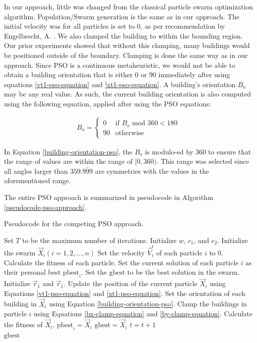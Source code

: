 In our approach, little was changed from the classical particle swarm optimization algorithm. Population/Swarm generation is the same as in our approach. The initial velocity was for all particles is set to $0$, as per recommendation by Engelbrecht, A. \cite{Engelbrecht2012}. We also clamped the building to within the bounding region. Our prior experiments showed that without this clamping, many buildings would be positioned outside of the boundary. Clamping is done the same way as in our approach. Since PSO is a continuous metaheuristic, we would not be able to obtain a building orientation that is either $0$ or $90$ immediately after using equations \ref{vt1-pso-equation} and \ref{xt1-pso-equation}. A building's orientation $B_{o}$ may be any real value. As such, the current building orientation is also computed using the following equation, applied after using the PSO equations:

\begin{align}
B_{o} = \left\{\begin{matrix}
0  & \text{if } B_{o}\text{ mod }360 < 180 \\ 
90 & \text{otherwise}
\end{matrix}\right. \label{building-orientation-pso}
\end{align}

In Equation \ref{building-orientation-pso}, the $B_{o}$ is modulo-ed by 360 to ensure that the range of values are within the range of $[0, 360)$. This range was selected since all angles larger than $359.\bar{999}$ are symmetries with the values in the aforementioned range.

The entire PSO approach is summarized in pseudocode in Algorithm \ref{pseudocode-pso-approach}.

\begin{algorithm}
\caption{Pseudocode for the competing PSO approach.}
\label{pseudocode-pso-approach}
\begin{algorithmic}[1]
\State Set $T$ to be the maximum number of iterations.
\State Initialize $w$, $c_{1}$, and $c_{2}$.
\State Initialize the swarm $\vec{X}_{i} (i = 1, 2, \ldots, n)$
\State Set the velocity $\vec{V}_{i}^{t}$ of each particle $i$ to $0$.
\State Calculate the fitness of each particle.
\State Set the current solution of each particle $i$ as their personal best $\text{pbest}_{i}$.
\State Set the $\text{gbest}$ to be the best solution in the swarm.
		\State Initialize $\vec{r}_{1}$ and $\vec{r}_{1}$.
		\State Update the position of the current particle $\vec{X}_{i}$ using Equations \ref{vt1-pso-equation} and \ref{xt1-pso-equation}.
		\State Set the orientation of each building in $\vec{X}_{i}$ using Equation \ref{building-orientation-pso}.
		\State Clamp the buildings in particle $i$ using Equations \ref{bx-clamp-equation} and \ref{by-clamp-equation}.
		\State Calculate the fitness of $\vec{X}_{i}$.
			\State $\text{pbest}_{i} = \vec{X}_{i}$
		\EndIf
			\State $\text{gbest} = \vec{X}_{i}$
		\EndIf
	\EndFor
	\State $t = t + 1$
\EndWhile \\
\Return $\text{gbest}$
\end{algorithmic}
\end{algorithm}